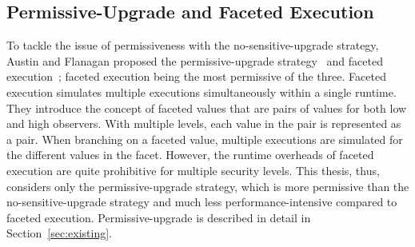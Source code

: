 \subsection{Permissive-Upgrade and Faceted Execution}
To tackle the issue of permissiveness with the no-sensitive-upgrade
strategy, Austin and Flanagan proposed 
the permissive-upgrade strategy~\cite{plas10} and faceted
execution~\cite{austin12POPL}; faceted execution being the most
permissive of the three. Faceted execution simulates multiple executions
simultaneously within a single runtime. They introduce the concept of
faceted values that are pairs of values for both low and high
observers. With multiple levels, each value in the pair is represented
as a pair. When branching on a faceted value, multiple executions are
simulated for the different values in the facet. However, the runtime 
overheads of faceted execution are quite prohibitive for multiple security 
levels. This thesis, thus, considers only the permissive-upgrade
strategy, which is more permissive than the no-sensitive-upgrade
strategy and much less performance-intensive compared to faceted
execution. Permissive-upgrade is described in detail in
Section~\ref{sec:existing}. 

